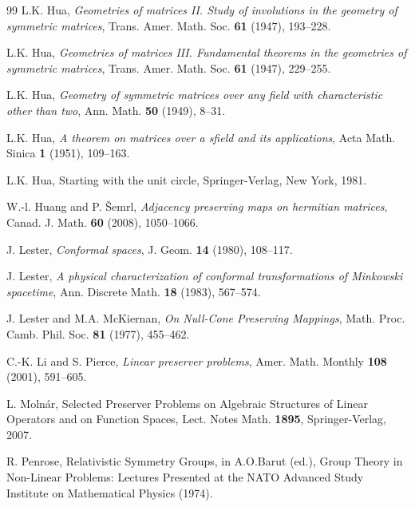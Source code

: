 \documentclass[10pt]{amsart}
\theoremstyle{definition}
\theoremstyle{remark}
\numberwithin{subsection}{section}
\numberwithin{equation}{section}
\begin{document}
\begin{thebibliography}{99}
L.K. Hua, \emph{Geometries of matrices II. Study of involutions in the geometry
of symmetric matrices},
Trans. Amer. Math. Soc. \textbf{61} (1947), 193--228.

L.K. Hua, \emph{Geometries of matrices III. Fundamental theorems in the geometries
of symmetric matrices},
Trans. Amer. Math. Soc. \textbf{61} (1947), 229--255.

L.K. Hua, \emph{Geometry of symmetric matrices over any field with characteristic
other than two},
Ann. Math. \textbf{50} (1949), 8--31.

L.K. Hua, \emph{A theorem on matrices over a sfield and its applications},
Acta Math. Sinica \textbf{1} (1951), 109--163.

L.K. Hua, Starting with the unit circle, Springer-Verlag, New York, 1981.

W.-l. Huang and P. \v Semrl, \emph{Adjacency preserving maps on hermitian matrices},
Canad. J. Math. \textbf{60} (2008), 1050--1066.

J. Lester, \emph{Conformal spaces}, J. Geom. \textbf{14} (1980),  108--117.

J. Lester, \emph{A physical characterization of conformal transformations of Minkowski spacetime},
Ann. Discrete Math. \textbf{18} (1983),  567--574.

J. Lester and M.A. McKiernan, \emph{On Null-Cone Preserving Mappings},
Math. Proc. Camb. Phil. Soc. \textbf{81} (1977), 455--462.

C.-K. Li and S. Pierce, \emph{Linear preserver problems}, Amer. Math. Monthly \textbf{108} (2001), 591--605.


L. Moln\' ar, Selected Preserver Problems on Algebraic Structures of Linear Operators and on Function Spaces, Lect. Notes Math. {\bf 1895}, Springer-Verlag, 2007.




R. Penrose,  Relativistic Symmetry Groups, in A.O.Barut (ed.), Group Theory in Non-Linear Problems: Lectures Presented at the NATO Advanced Study Institute on Mathematical Physics (1974).


\end{thebibliography}
\end{document}
